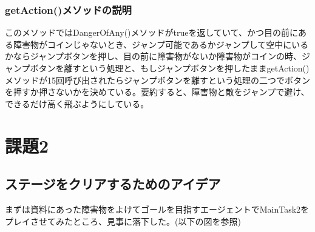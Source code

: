\documentclass{jsarticle}
\begin{document}
\subsubsection{getAction()メソッドの説明}
このメソッドではDangerOfAny()メソッドがtrueを返していて、かつ目の前にある障害物がコインじゃないとき、ジャンプ可能であるかジャンプして空中にいるかならジャンプボタンを押し、目の前に障害物がないか障害物がコインの時、ジャンプボタンを離すという処理と、もしジャンプボタンを押したままgetAction()メソッドが15回呼び出されたらジャンプボタンを離すという処理の二つでボタンを押すか押さないかを決めている。要約すると、障害物と敵をジャンプで避け、できるだけ高く飛ぶようにしている。

\section{課題2}
\subsection{ステージをクリアするためのアイデア}
まずは資料にあった障害物をよけてゴールを目指すエージェントでMainTask2をプレイさせてみたところ、見事に落下した。(以下の図を参照)
\end{document}
